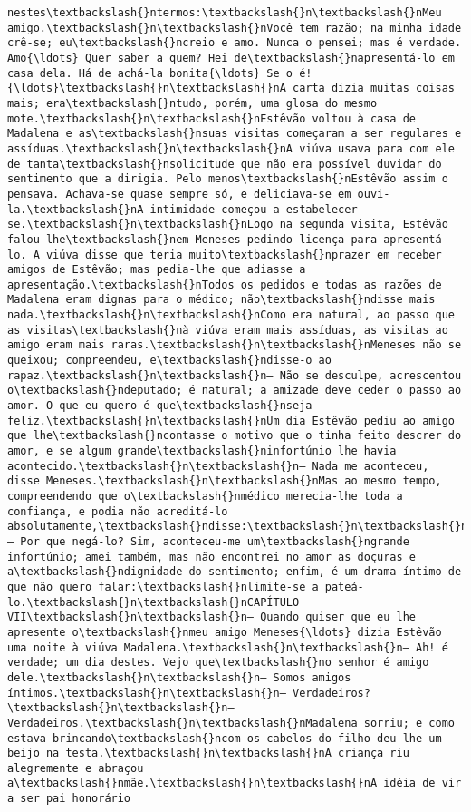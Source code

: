 \documentclass[11pt]{article}
\begin{document}
\begin{Verbatim}[commandchars=\\\{\}]
nestes\textbackslash{}ntermos:\textbackslash{}n\textbackslash{}nMeu amigo.\textbackslash{}n\textbackslash{}nVocê tem razão; na minha idade crê-se; eu\textbackslash{}ncreio e amo. Nunca o pensei; mas é verdade. Amo{\ldots} Quer saber a quem? Hei de\textbackslash{}napresentá-lo em casa dela. Há de achá-la bonita{\ldots} Se o é!{\ldots}\textbackslash{}n\textbackslash{}nA carta dizia muitas coisas mais; era\textbackslash{}ntudo, porém, uma glosa do mesmo mote.\textbackslash{}n\textbackslash{}nEstêvão voltou à casa de Madalena e as\textbackslash{}nsuas visitas começaram a ser regulares e assíduas.\textbackslash{}n\textbackslash{}nA viúva usava para com ele de tanta\textbackslash{}nsolicitude que não era possível duvidar do sentimento que a dirigia. Pelo menos\textbackslash{}nEstêvão assim o pensava. Achava-se quase sempre só, e deliciava-se em ouvi-la.\textbackslash{}nA intimidade começou a estabelecer-se.\textbackslash{}n\textbackslash{}nLogo na segunda visita, Estêvão falou-lhe\textbackslash{}nem Meneses pedindo licença para apresentá-lo. A viúva disse que teria muito\textbackslash{}nprazer em receber amigos de Estêvão; mas pedia-lhe que adiasse a apresentação.\textbackslash{}nTodos os pedidos e todas as razões de Madalena eram dignas para o médico; não\textbackslash{}ndisse mais nada.\textbackslash{}n\textbackslash{}nComo era natural, ao passo que as visitas\textbackslash{}nà viúva eram mais assíduas, as visitas ao amigo eram mais raras.\textbackslash{}n\textbackslash{}nMeneses não se queixou; compreendeu, e\textbackslash{}ndisse-o ao rapaz.\textbackslash{}n\textbackslash{}n— Não se desculpe, acrescentou o\textbackslash{}ndeputado; é natural; a amizade deve ceder o passo ao amor. O que eu quero é que\textbackslash{}nseja feliz.\textbackslash{}n\textbackslash{}nUm dia Estêvão pediu ao amigo que lhe\textbackslash{}ncontasse o motivo que o tinha feito descrer do amor, e se algum grande\textbackslash{}ninfortúnio lhe havia acontecido.\textbackslash{}n\textbackslash{}n— Nada me aconteceu, disse Meneses.\textbackslash{}n\textbackslash{}nMas ao mesmo tempo, compreendendo que o\textbackslash{}nmédico merecia-lhe toda a confiança, e podia não acreditá-lo absolutamente,\textbackslash{}ndisse:\textbackslash{}n\textbackslash{}n— Por que negá-lo? Sim, aconteceu-me um\textbackslash{}ngrande infortúnio; amei também, mas não encontrei no amor as doçuras e a\textbackslash{}ndignidade do sentimento; enfim, é um drama íntimo de que não quero falar:\textbackslash{}nlimite-se a pateá-lo.\textbackslash{}n\textbackslash{}nCAPÍTULO VII\textbackslash{}n\textbackslash{}n— Quando quiser que eu lhe apresente o\textbackslash{}nmeu amigo Meneses{\ldots} dizia Estêvão uma noite à viúva Madalena.\textbackslash{}n\textbackslash{}n— Ah! é verdade; um dia destes. Vejo que\textbackslash{}no senhor é amigo dele.\textbackslash{}n\textbackslash{}n— Somos amigos íntimos.\textbackslash{}n\textbackslash{}n— Verdadeiros?\textbackslash{}n\textbackslash{}n— Verdadeiros.\textbackslash{}n\textbackslash{}nMadalena sorriu; e como estava brincando\textbackslash{}ncom os cabelos do filho deu-lhe um beijo na testa.\textbackslash{}n\textbackslash{}nA criança riu alegremente e abraçou a\textbackslash{}nmãe.\textbackslash{}n\textbackslash{}nA idéia de vir a ser pai honorário 
\end{Verbatim}
\end{document}
